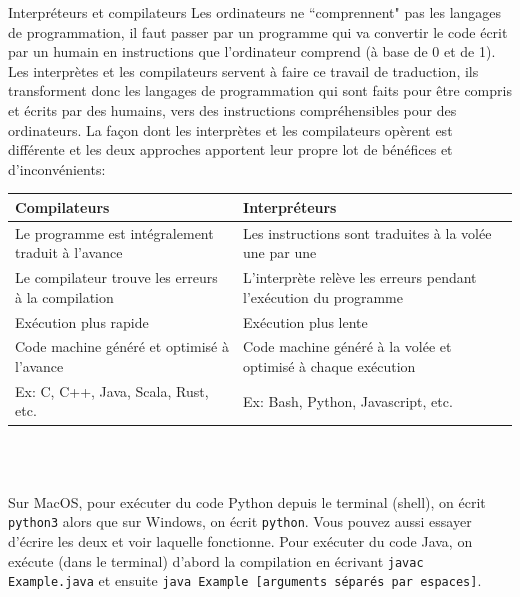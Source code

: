 \begin{section}{Interpréteurs et compilateurs}
    Les ordinateurs ne ``comprennent" pas les langages de programmation, il faut passer par un programme qui va convertir le code écrit par un humain en instructions que l'ordinateur comprend (à base de 0 et de 1).
\\
Les interprètes et les compilateurs servent à faire ce travail de traduction, ils transforment donc les langages de programmation qui sont faits pour être compris et écrits par des humains, vers des instructions compréhensibles pour des ordinateurs.
La façon dont les interprètes et les compilateurs opèrent est différente et les deux approches apportent leur propre lot de bénéfices et d'inconvénients: \newline 
    
\begin{tabular}{| C{0.45\textwidth} | C{0.45\textwidth} |} 
        \hline
        \textbf{Compilateurs} & \textbf{Interpréteurs}\\ [0.5ex]
        \hline
        Le programme est intégralement traduit à l'avance & Les instructions sont traduites à la volée une par une  \\
        \hline
        Le compilateur trouve les erreurs à la compilation & L'interprète relève les erreurs pendant l'exécution du programme  \\
        \hline
        Exécution plus rapide & Exécution plus lente \\
        \hline
        Code machine généré et optimisé à l'avance & Code machine généré à la volée et optimisé à chaque exécution  \\
        \hline
        Ex: C, C++, Java, Scala, Rust, etc. & Ex: Bash, Python, Javascript, etc. \\
        \hline
    \end{tabular}
    \\\\
    \begin{attention}
    Sur MacOS, pour exécuter du code Python depuis le terminal (shell), on écrit \texttt{python3} alors que sur Windows, on écrit \texttt{python}. Vous pouvez aussi essayer d'écrire les deux et voir laquelle fonctionne. Pour exécuter du code Java, on exécute (dans le terminal) d'abord la compilation en écrivant \texttt{javac Example.java} et ensuite \texttt{java Example [arguments séparés par espaces]}.
\end{attention}
    \begin{Exercice}[10 minutes]

\end{Exercice}
\end{section}
